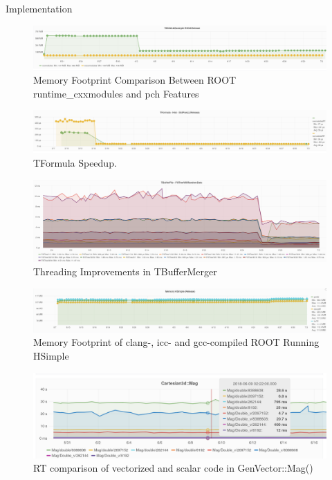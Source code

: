 \documentclass{webofc}
\begin{document}
\begin{block}{Implementation}
\begin{figure}
\includegraphics[width=1.0\linewidth]{pictures/2.png}
\caption{Memory Footprint Comparison Between ROOT runtime\_cxxmodules and pch Features}
\label{interp1}
\end{figure}

\begin{figure}
\includegraphics[width=1.0\linewidth]{pictures/4.png}
\caption{TFormula Speedup.}
\label{tform}
\end{figure}

\begin{figure}
\includegraphics[width=1.0\linewidth]{pictures/5.png}
\caption{Threading Improvements in TBufferMerger}
\label{tbuf}
\end{figure}

\begin{figure}
\includegraphics[width=1.0\linewidth]{pictures/7.png}
\caption{Memory Footprint of clang-, icc- and gcc-compiled ROOT Running HSimple}
\label{fig:compilers}
\end{figure}

\begin{figure}
\includegraphics[width=1.0\linewidth]{pictures/genvector.png}
\caption{RT comparison of vectorized and scalar code in GenVector::Mag()}
\label{fig:genvec}
\end{figure}


\end{block}
\end{document}
